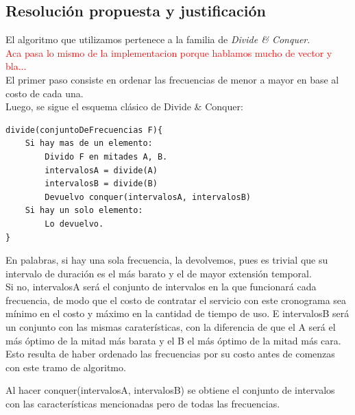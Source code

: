 \newpage

\subsection{Resoluci\'on propuesta y justificaci\'on}

El algoritmo que utilizamos pertenece a la familia de \emph{Divide \& Conquer}.\\

\textcolor{red}{Aca pasa lo mismo de la implementacion porque hablamos mucho de vector y bla...}\\

El primer paso consiste en ordenar las frecuencias de menor a mayor en base al costo de cada una.\\

Luego, se sigue el esquema cl\'asico de Divide \& Conquer:\\

	\begin{codesnippet}
	\begin{verbatim}
divide(conjuntoDeFrecuencias F){
    Si hay mas de un elemento:
        Divido F en mitades A, B.
        intervalosA = divide(A)
        intervalosB = divide(B)
        Devuelvo conquer(intervalosA, intervalosB)
    Si hay un solo elemento:
        Lo devuelvo.	
}
	\end{verbatim}
	\end{codesnippet}

En palabras, si hay una sola frecuencia, la devolvemos, pues es trivial que su intervalo de duraci\'on es el m\'as barato y el de mayor extensi\'on temporal.\\

Si no, intervalosA ser\'a el conjunto de intervalos en la que funcionar\'a cada frecuencia, de modo que el costo de contratar el servicio con este cronograma sea m\'inimo en el costo y m\'aximo en la cantidad de tiempo de uso. E intervalosB ser\'a un conjunto con las mismas carater\'isticas, con la diferencia de que el A ser\'a el m\'as \'optimo de la mitad m\'as barata y el B el m\'as \'optimo de la mitad m\'as cara. Esto resulta de haber ordenado las frecuencias por su costo antes de comenzas con este tramo de algoritmo.

Al hacer conquer(intervalosA, intervalosB) se obtiene el conjunto de intervalos con las caracter\'isticas mencionadas pero de todas las frecuencias.\\


